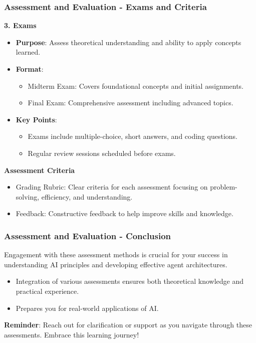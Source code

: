 \documentclass[aspectratio=169]{beamer}
\begin{document}
\begin{frame}[fragile]
    \frametitle{Assessment and Evaluation - Exams and Criteria}
    \textbf{3. Exams}
    
    \begin{itemize}
        \item \textbf{Purpose}: Assess theoretical understanding and ability to apply concepts learned.
        \item \textbf{Format}:
        \begin{itemize}
            \item Midterm Exam: Covers foundational concepts and initial assignments.
            \item Final Exam: Comprehensive assessment including advanced topics.
        \end{itemize}
        \item \textbf{Key Points}:
        \begin{itemize}
            \item Exams include multiple-choice, short answers, and coding questions.
            \item Regular review sessions scheduled before exams.
        \end{itemize}
    \end{itemize}

    \textbf{Assessment Criteria}
    
    \begin{itemize}
        \item Grading Rubric: Clear criteria for each assessment focusing on problem-solving, efficiency, and understanding.
        \item Feedback: Constructive feedback to help improve skills and knowledge.
    \end{itemize}
\end{frame}

\begin{frame}[fragile]
    \frametitle{Assessment and Evaluation - Conclusion}
    Engagement with these assessment methods is crucial for your success in understanding AI principles and developing effective agent architectures. 

    \begin{itemize}
        \item Integration of various assessments ensures both theoretical knowledge and practical experience.
        \item Prepares you for real-world applications of AI.
    \end{itemize}

    \textbf{Reminder}: Reach out for clarification or support as you navigate through these assessments. Embrace this learning journey!
\end{frame}
\end{document}
